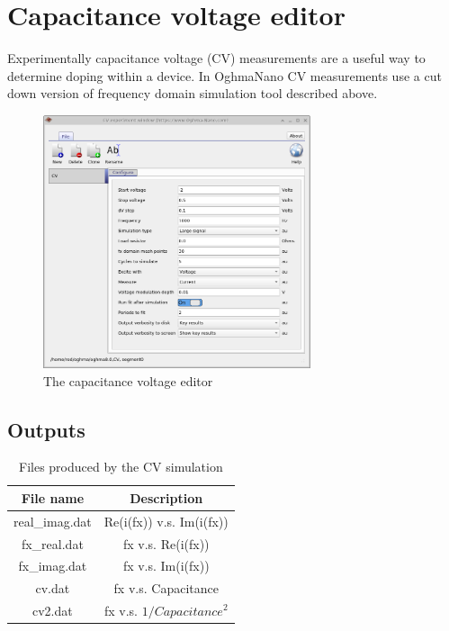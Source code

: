 \clearpage
\section{Capacitance voltage editor}
Experimentally capacitance voltage (CV) measurements are a useful way to determine doping within a device. In OghmaNano CV measurements use a cut down version of frequency domain simulation tool described above.

\begin{figure}[H]
\centering
\includegraphics[width=0.7\textwidth,height=0.5\textwidth]{./images/sim_editors/cv.png}
\caption{The capacitance voltage editor}
\label{fig:cv_editor}
\end{figure}

\subsection{Outputs}

\begin{table}[H]
\begin{center}
\begin{tabular}{ |c|c| } 
 \hline
	File name 		& 	Description  \\ 
 \hline
	real\_imag.dat 		&	Re(i(fx)) v.s. Im(i(fx)) \\ 
	fx\_real.dat 		&	fx v.s. Re(i(fx)) \\ 
	fx\_imag.dat 		&	fx v.s. Im(i(fx)) \\ 
	cv.dat 				&	fx v.s. Capacitance \\ 
	cv2.dat 			&	fx v.s. $1/{Capacitance}^2$ \\ 
 \hline
\end{tabular}
\caption{Files produced by the CV simulation}
\label{tab:suns_jsc_output}
\end{center}
\end{table}
